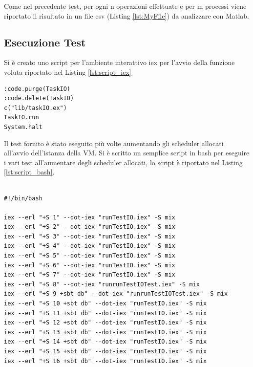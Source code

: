 Come nel precedente test, per ogni n operazioni effettuate e per m
processi viene riportato il risultato in un file csv
(Listing \ref{lst:MyFile}) da analizzare con Matlab.




\subsection{Esecuzione Test}

Si è creato uno script per l'ambiente interattivo iex per l'avvio
della funzione voluta riportato nel Listing \ref{lst:script_iex}

\begin{lstlisting}[language=none,captionpos=b,
	caption={Script iex per l'avvio dei test "runTestIO.iex},
	label={lst:script_iex}]
:code.purge(TaskIO)
:code.delete(TaskIO)
c("lib/taskIO.ex")
TaskIO.run
System.halt
\end{lstlisting}
	

Il test fornito è stato eseguito più volte aumentando
gli scheduler allocati all'avvio dell'istanza della VM.
Si è scritto un semplice script in bash per eseguire
i vari test all'aumentare degli scheduler allocati, lo script
è riportato nel Listing \ref{lst:script_bash}.


\begin{lstlisting}[language=none,captionpos=b,
	caption={Script bash per l'avvio dei test},
	label={lst:script_bash}]

#!/bin/bash

iex --erl "+S 1" --dot-iex "runTestIO.iex" -S mix
iex --erl "+S 2" --dot-iex "runTestIO.iex" -S mix
iex --erl "+S 3" --dot-iex "runTestIO.iex" -S mix
iex --erl "+S 4" --dot-iex "runTestIO.iex" -S mix
iex --erl "+S 5" --dot-iex "runTestIO.iex" -S mix
iex --erl "+S 6" --dot-iex "runTestIO.iex" -S mix
iex --erl "+S 7" --dot-iex "runTestIO.iex" -S mix
iex --erl "+S 8" --dot-iex "runrunTestIOTest.iex" -S mix
iex --erl "+S 9 +sbt db" --dot-iex "runrunTestIOTest.iex" -S mix
iex --erl "+S 10 +sbt db" --dot-iex "runTestIO.iex" -S mix
iex --erl "+S 11 +sbt db" --dot-iex "runTestIO.iex" -S mix
iex --erl "+S 12 +sbt db" --dot-iex "runTestIO.iex" -S mix
iex --erl "+S 13 +sbt db" --dot-iex "runTestIO.iex" -S mix
iex --erl "+S 14 +sbt db" --dot-iex "runTestIO.iex" -S mix
iex --erl "+S 15 +sbt db" --dot-iex "runTestIO.iex" -S mix
iex --erl "+S 16 +sbt db" --dot-iex "runTestIO.iex" -S mix
	
\end{lstlisting}

